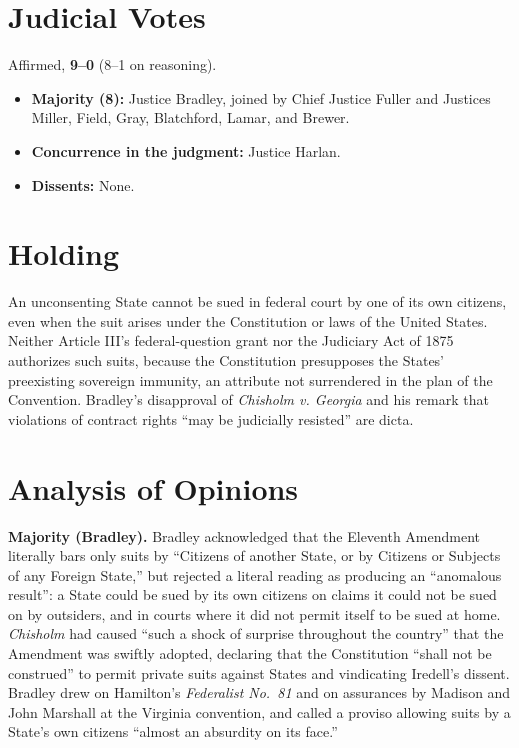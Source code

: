 \documentclass[12pt]{article}
\begin{document}
\section{Judicial Votes}

Affirmed, \textbf{9--0} (8--1 on reasoning).
\begin{itemize}
\item \textbf{Majority (8):} Justice Bradley, joined by Chief Justice Fuller and Justices Miller, Field, Gray, Blatchford, Lamar, and Brewer.
\item \textbf{Concurrence in the judgment:} Justice Harlan.
\item \textbf{Dissents:} None.
\end{itemize}

\section{Holding}

An unconsenting State cannot be sued in federal court by one of its own citizens, even when the suit arises under the Constitution or laws of the United States. Neither Article III's federal-question grant nor the Judiciary Act of 1875 authorizes such suits, because the Constitution presupposes the States' preexisting sovereign immunity, an attribute not surrendered in the plan of the Convention. Bradley's disapproval of \textit{Chisholm v. Georgia} and his remark that violations of contract rights ``may be judicially resisted'' are dicta.

\section{Analysis of Opinions}

\textbf{Majority (Bradley).} Bradley acknowledged that the Eleventh Amendment literally bars only suits by ``Citizens of another State, or by Citizens or Subjects of any Foreign State,'' but rejected a literal reading as producing an ``anomalous result'': a State could be sued by its own citizens on claims it could not be sued on by outsiders, and in courts where it did not permit itself to be sued at home. \textit{Chisholm} had caused ``such a shock of surprise throughout the country'' that the Amendment was swiftly adopted, declaring that the Constitution ``shall not be construed'' to permit private suits against States and vindicating Iredell's dissent. Bradley drew on Hamilton's \textit{Federalist No.\ 81} and on assurances by Madison and John Marshall at the Virginia convention, and called a proviso allowing suits by a State's own citizens ``almost an absurdity on its face.''
\end{document}
